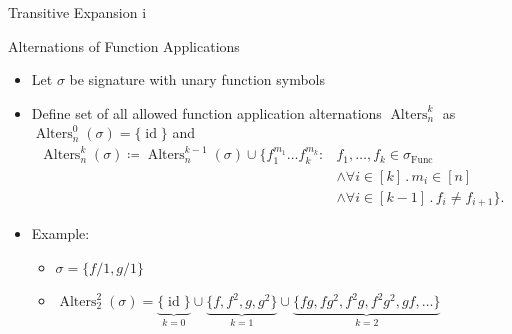 \documentclass[aspectratio=169]{beamer}
\begin{document}
	\begin{frame}{Transitive Expansion i}
		\begin{block}{Alternations of Function Applications}
			\begin{itemize}
				\item Let $\sigma$ be signature with unary function symbols
				\item Define set of all allowed function application alternations $\operatorname{Alters}^k_n$ as $\operatorname{Alters}^0_n(\sigma)=\{\operatorname{id}\}$ and 
				\begin{align*}
					\operatorname{Alters}^k_{n}(\sigma)\coloneqq \operatorname{Alters}^{k-1}_{n}(\sigma)\cup\{f_1^{m_1}\dots f_k^{m_k} : & f_1,\dots, f_k\in \sigma_{\operatorname{Func}} \\ 
					& \land \forall i\in[k]\operatorname{.} m_i\in[n] \\ 
					& \land \forall i\in[k-1] \operatorname{.} f_{i} \neq f_{i+1}\}.
				\end{align*}
			\end{itemize}
		\end{block}
		\begin{itemize}
			\item Example: 
			\begin{itemize}
				\item $\sigma=\{f/1,g/1\}$
				\item $\operatorname{Alters}^2_2(\sigma)=\underbrace{\{\operatorname{id}\}}_{k=0} \cup \underbrace{\{f,f^2,g,g^2\}}_{k=1} \cup \underbrace{\{fg, fg^2, f^2g, f^2g^2, gf, \dots\}}_{k=2}$
			\end{itemize}
		\end{itemize}
	\end{frame}
	
\end{document}
